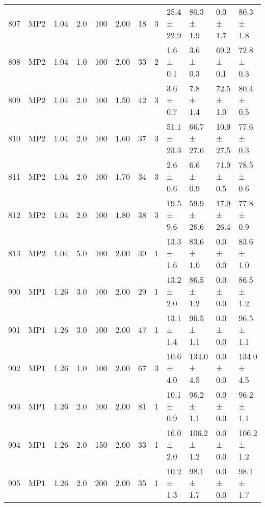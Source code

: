 \begin{table}
{\begin{tabular}{llllllllllll}
            807 &           MP2 &        1.04 &       2.0 &              100 &            2.00 &  18 &           3 & 25.4 ± 22.9 &   80.3 ± 1.9 &    0.0 ± 1.7 &  80.3 ± 1.8 \\
            808 &           MP2 &        1.04 &       1.0 &              100 &            2.00 &  33 &           2 &   1.6 ± 0.1 &    3.6 ± 0.3 &   69.2 ± 0.1 &  72.8 ± 0.3 \\
            809 &           MP2 &        1.04 &       2.0 &              100 &            1.50 &  42 &           3 &   3.6 ± 0.7 &    7.8 ± 1.4 &   72.5 ± 1.0 &  80.4 ± 0.5 \\
            810 &           MP2 &        1.04 &       2.0 &              100 &            1.60 &  37 &           3 & 51.1 ± 23.3 &  66.7 ± 27.6 &  10.9 ± 27.5 &  77.6 ± 0.3 \\
            811 &           MP2 &        1.04 &       2.0 &              100 &            1.70 &  34 &           3 &   2.6 ± 0.6 &    6.6 ± 0.9 &   71.9 ± 0.5 &  78.5 ± 0.6 \\
            812 &           MP2 &        1.04 &       2.0 &              100 &            1.80 &  38 &           3 &  19.5 ± 9.6 &  59.9 ± 26.6 &  17.9 ± 26.4 &  77.8 ± 0.9 \\
            813 &           MP2 &        1.04 &       5.0 &              100 &            2.00 &  39 &           1 &  13.3 ± 1.6 &   83.6 ± 1.0 &    0.0 ± 0.0 &  83.6 ± 1.0 \\
            900 &           MP1 &        1.26 &       3.0 &              100 &            2.00 &  29 &           1 &  13.2 ± 2.0 &   86.5 ± 1.2 &    0.0 ± 0.0 &  86.5 ± 1.2 \\
            901 &           MP1 &        1.26 &       3.0 &              100 &            2.00 &  47 &           1 &  13.1 ± 1.4 &   96.5 ± 1.1 &    0.0 ± 0.0 &  96.5 ± 1.1 \\
            902 &           MP1 &        1.26 &       1.0 &              100 &            2.00 &  67 &           3 &  10.6 ± 4.0 &  134.0 ± 4.5 &    0.0 ± 0.0 & 134.0 ± 4.5 \\
            903 &           MP1 &        1.26 &       2.0 &              100 &            2.00 &  81 &           1 &  10.1 ± 0.9 &   96.2 ± 1.1 &    0.0 ± 0.0 &  96.2 ± 1.1 \\
            904 &           MP1 &        1.26 &       2.0 &              150 &            2.00 &  33 &           1 &  16.0 ± 2.0 &  106.2 ± 1.2 &    0.0 ± 0.0 & 106.2 ± 1.2 \\
            905 &           MP1 &        1.26 &       2.0 &              200 &            2.00 &  35 &           1 &  10.2 ± 1.3 &   98.1 ± 1.7 &    0.0 ± 0.0 &  98.1 ± 1.7 \\

\end{tabular}}
\end{table}
